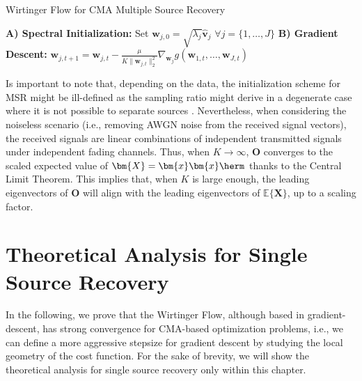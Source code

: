 \begin{algorithm}[H]
	\caption{Wirtinger Flow for CMA Multiple Source Recovery}
	\label{alg:wf-msr}
	\begin{algorithmic}[1]
		\Statex \textbf{A) Spectral Initialization:}
		\State Set $\bm{w}_{j,0}=\sqrt{\lambda_j}\hat{\bm{v}}_j$ $\forall j=\{1,\ldots,J\}$
		\Statex \textbf{B) Gradient Descent:}
		\State $\displaystyle \bm{w}_{j,t+1}=\bm{w}_{j,t}-\frac{\mu}{K\|\bm{w}_{j,t}\|_2^2}\nabla_{\bm{w}_{j}}g(\bm{w}_{1,t},\ldots,\bm{w}_{J,t})$
		\EndFor
		\EndFor
	\end{algorithmic}
\end{algorithm}

Is important to note that, depending on the data, the initialization scheme for MSR might be ill-defined as the sampling ratio might derive in a degenerate case where it is not possible to separate sources \cite{Lu2017spectralinit}. Nevertheless, when considering the noiseless scenario (i.e., removing AWGN noise from the received signal vectors), the received signals are linear combinations of independent transmitted signals under independent fading channels. Thus, when $K\rightarrow\infty$, $\bm{O}$ converges to the scaled expected value of $\bm{X}=\bm{x}\bm{x}\herm$ thanks to the Central Limit Theorem. This implies that, when $K$ is large enough, the leading eigenvectors of $\bm{O}$ will align with the leading eigenvectors of $\mathbb{E}\{\bm{X}\}$, up to  a scaling factor.



\section{Theoretical Analysis for Single Source Recovery} \label{sec:analysis_wf}


In the following, we prove that the Wirtinger Flow, although based in gradient-descent, has strong convergence for CMA-based optimization problems, i.e., we can define a more aggressive stepsize for gradient descent by studying the local geometry of the cost function.  For the sake of brevity, we will show the theoretical analysis for single source recovery only within this chapter.

